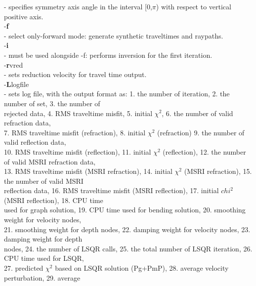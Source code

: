 \documentclass[twoside,final,onecolumn]{article}
\newcommand{\forceindent}{\leavevmode{\parindent=1em\indent}}
\begin{document}
\forceindent\forceindent - specifies symmetry axis angle in the interval [0,$\pi$) with respect to vertical positive axis.\\[6pt]
\forceindent -\textbf{f} \\
\forceindent\forceindent - select only-forward mode: generate synthetic traveltimes and raypaths.\\[6pt]
\forceindent -\textbf{i} \\
\forceindent\forceindent - must be used alongside -f: performs inversion for the first iteration.\\[6pt]
\forceindent -\textbf{r}vred \\
\forceindent\forceindent - sets reduction velocity for travel time output.\\[6pt]
\forceindent -\textbf{L}logfile \\
\forceindent\forceindent - sets log file, with the output format as: 1. the number of iteration, 2. the number of set, 3. the number of\\
\forceindent\forceindent rejected data, 4. RMS traveltime misfit, 5. initial $\chi^2$, 6. the number of valid refraction data,\\
\forceindent\forceindent 7. RMS traveltime misfit (refraction), 8. initial $\chi^2$ (refraction) 9. the number of valid reflection data,\\
\forceindent\forceindent 10. RMS traveltime misfit (reflection), 11. initial $\chi^2$ (reflection), 12. the number of valid MSRI refraction data,\\
\forceindent\forceindent 13. RMS traveltime misfit (MSRI refraction), 14. initial $\chi^2$ (MSRI refraction), 15. the number of valid MSRI\\
\forceindent\forceindent reflection data, 16. RMS traveltime misfit (MSRI reflection), 17. initial $chi^2$ (MSRI reflection), 18. CPU time\\
\forceindent\forceindent used for graph solution, 19. CPU time used for bending solution, 20. smoothing weight for velocity nodes,\\
\forceindent\forceindent 21. smoothing weight for depth nodes, 22. damping weight for velocity nodes, 23. damping weight for depth\\
\forceindent\forceindent nodes, 24. the number of LSQR calls, 25. the total number of LSQR iteration, 26. CPU time used for LSQR,\\
\forceindent\forceindent 27. predicted $\chi^2$ based on LSQR solution (Pg+PmP), 28. average velocity perturbation, 29. average\\
\end{document}
